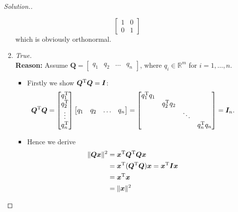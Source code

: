 \begin{enumerate}
\begin{proof}[Solution.]
\begin{enumerate}
\[\begin{bmatrix}
1&0\\0&1
\end{bmatrix}
\]
which is obviously orthonormal.
\item
\textit{True.}\\
\textbf{Reason: }
Assume $\bm Q=\begin{bmatrix}
q_1&q_2&\dots&q_n
\end{bmatrix}$, where $q_i\in\mathbb{R}^{m}$ for $i=1,\dots,n$.\\
\begin{itemize}
\item
Firstly we show $\bm Q^{\mathrm T}\bm Q=\bm I$:
\[
\bm Q^{\mathrm T}\bm Q=\begin{bmatrix}
q_1^{\mathrm T}\\q_2^{\mathrm T}\\\vdots\\q_n^{\mathrm T}
\end{bmatrix}\begin{bmatrix}
q_1&q_2&\dots&q_n
\end{bmatrix}=\begin{bmatrix}
q_1^{\mathrm T} q_1&&&\\
&q_2^{\mathrm T} q_2&&\\
&&\ddots&\\
&&&q_n^{\mathrm T} q_n
\end{bmatrix}=\bm I_{n}.
\]
\item
Hence we derive
\begin{align*}
\|\bm{Qx}\|^2&=\bm x^{\mathrm T}\bm Q^{\mathrm T}\bm Q\bm x\\
&=\bm x^{\mathrm T}(\bm Q^{\mathrm T}\bm Q)\bm x=\bm x^{\mathrm T}\bm I\bm x\\
&=\bm x^{\mathrm T}\bm x\\
&=\|\bm x\|^2
\end{align*}


\end{itemize}
\end{enumerate}
\end{proof}
\end{enumerate}
